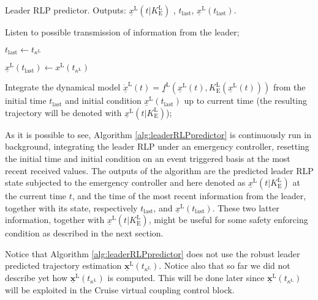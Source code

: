 \documentclass[letterpaper, 10 pt, conference]{ieeeconf}
\theoremstyle{definition}
\theoremstyle{nopoint}
\begin{document}
\begin{algorithm}
\caption{Leader RLP predictor. Outputs: $\underline{x}^\mathrm{L}(t|K_\mathrm{E}^\mathrm{L})$ , $t_{\mathrm{last}}$, $\underline{x}^\mathrm{L}(t_{\mathrm{last}})$. }\label{alg:leaderRLPpredictor}
\begin{algorithmic}[1]
\Loop

\State Listen to possible transmission of information from the leader;

 
\State $t_{\mathrm{last}} \leftarrow t_{\kappa^\mathrm{L}}$

\State $\underline{x}^\mathrm{L}(t_{\mathrm{last}}) \leftarrow x^\mathrm{L}(t_{\kappa^\mathrm{L}})$

\EndIf


\State Integrate the dynamical model  $\underline{\dot{x}}^\mathrm{L}(t) = \underline{f}^\mathrm{L}(\underline{x}^\mathrm{L}(t),K_\mathrm{E}^\mathrm{L}(\underline{x}^\mathrm{L}(t)))$ from the initial time $t_{\mathrm{last}}$ and initial condition $\underline{x}^\mathrm{L}(t_{\mathrm{last}})$  up to current time (the resulting trajectory will be denoted
with $\underline{x}^\mathrm{L}(t|K_\mathrm{E}^\mathrm{L})$);



\EndLoop

\end{algorithmic}
\end{algorithm}


As it is possible to see, Algorithm \ref{alg:leaderRLPpredictor} is continuously run in background, integrating the leader RLP under an emergency controller, resetting the initial time and initial condition on an event triggered basis at the most recent received values. 
The outputs of the algorithm are the predicted leader RLP state subjected to the emergency controller and here denoted as $\underline{x}^\mathrm{L}(t|K_\mathrm{E}^\mathrm{L})$ at the current time $t$, and the time of the most recent information from the leader, together with its state, respectively $t_{\mathrm{last}}$, and $\underline{x}^\mathrm{L}(t_{\mathrm{last}})$. These two latter information, together with $\underline{x}^\mathrm{L}(t|K_\mathrm{E}^\mathrm{L})$, might be useful for some safety enforcing condition as described in the next section. 


Notice that Algorithm \ref{alg:leaderRLPpredictor} does not use the robust leader predicted trajectory estimation $\underline{\mathbf{x}}^\mathrm{L}(t_{\kappa^\mathrm{L}})$.
Notice also that so far we did not describe yet how $\underline{\mathbf{x}}^\mathrm{L}(t_{\kappa^\mathrm{L}})$ is computed. This will be done later since $\underline{\mathbf{x}}^\mathrm{L}(t_{\kappa^\mathrm{L}})$ will be exploited in the Cruise virtual coupling control block. 
\end{document}
